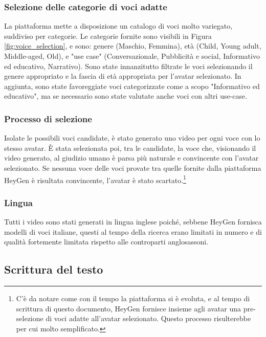 \subsubsection{Selezione delle categorie di voci adatte}

La piattaforma mette a disposizione un catalogo di voci molto variegato, suddiviso per categorie. Le categorie fornite sono visibili in Figura \ref{fig:voice_selection}, e sono: genere (Maschio, Femmina), età (Child, Young adult, Middle-aged, Old), e "use case" (Conversazionale, Pubblicità e social, Informativo ed educativo, Narrativo). Sono state innanzitutto filtrate le voci selezionando il genere appropriato e la fascia di età appropriata per l'avatar selezionato. In aggiunta, sono state favoreggiate voci categorizzate come a scopo "Informativo ed educativo", ma se necessario sono state valutate anche voci con altri use-case.

\subsubsection{Processo di selezione}

Isolate le possibili voci candidate, è stato generato uno video per ogni voce con lo stesso avatar. È stata selezionata poi, tra le candidate, la voce che, visionando il video generato, al giudizio umano è parsa più naturale e convincente con l'avatar selezionato. Se nessuna voce delle voci provate tra quelle fornite dalla piattaforma HeyGen è risultata convincente, l'avatar è stato scartato.\footnote{C'è da notare come con il tempo la piattaforma si è evoluta, e al tempo di scrittura di questo documento, HeyGen fornisce insieme agli avatar una pre-selezione di voci adatte all'avatar selezionato. Questo processo risulterebbe per cui molto semplificato.}

\subsubsection{Lingua} Tutti i video sono stati generati in lingua inglese poiché, sebbene HeyGen fornisca modelli di voci italiane, questi al tempo della ricerca erano limitati in numero e di qualità fortemente limitata rispetto alle controparti anglosassoni.

\subsection{Scrittura del testo}

